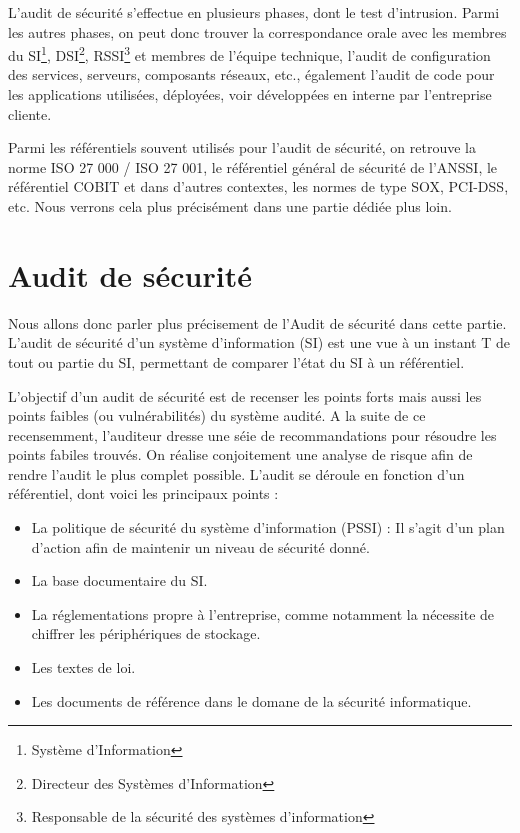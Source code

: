 \documentclass[a4paper]{memoir}
\begin{document}
L’audit de sécurité s’effectue en plusieurs phases, dont le test d’intrusion. Parmi les autres phases, on peut donc trouver la correspondance orale avec les membres du SI\footnote{Système d'Information}, DSI\footnote{Directeur des Systèmes d'Information}, RSSI\footnote{Responsable de la sécurité des systèmes d'information} et membres de l’équipe technique, l’audit de configuration des services, serveurs, composants réseaux, etc., également l’audit de code pour les applications utilisées, déployées, voir développées en interne par l’entreprise cliente.

Parmi les référentiels souvent utilisés pour l’audit de sécurité, on retrouve la norme ISO 27 000 / ISO 27 001, le référentiel général de sécurité de l’ANSSI, le référentiel COBIT et dans d’autres contextes, les normes de type SOX, PCI-DSS, etc. Nous verrons cela plus précisément dans une partie dédiée plus loin.


\section{Audit de sécurité}

Nous allons donc parler plus précisement de l'Audit de sécurité dans cette partie. L'audit de sécurité d'un système d'information (SI) est une vue à un instant T de tout ou partie du SI, permettant de comparer l'état du SI à un référentiel.

L'objectif d'un audit de sécurité est de recenser les points forts mais aussi les points faibles (ou vulnérabilités) du système audité. A la suite de ce recensemment, l'auditeur dresse une séie de recommandations pour résoudre les points fabiles trouvés. On réalise conjoitement une analyse de risque afin de rendre l'audit le plus complet possible.
L'audit se déroule en fonction d'un référentiel, dont voici les principaux points :

\begin{itemize}
  \item La politique de sécurité du système d'information (PSSI) : Il s'agit d'un plan d'action afin de maintenir un niveau de sécurité donné.
  \item La base documentaire du SI.
  \item La réglementations propre à l'entreprise, comme notamment la nécessite de chiffrer les périphériques de stockage.
  \item Les textes de loi.
    \item Les documents de référence dans le domane de la sécurité informatique.
\end{itemize}
\end{document}
